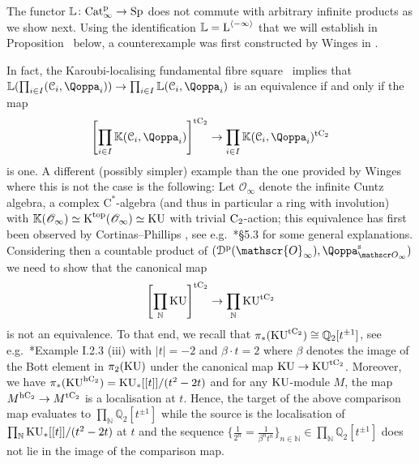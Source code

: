\begin{remark}
The functor $\mathbb{L} \colon \mathrm{Cat}^{\mathrm p}_\infty \rightarrow \mathrm{Sp}$ does not commute with arbitrary infinite products as we show next. Using the identification $\mathbb{L} = \operatorname L^{\langle -\infty \rangle}$ that we will establish in Proposition~ below, a counterexample was first constructed by Winges in \cite{winges-Ltheory}. 

In fact, the Karoubi-localising fundamental fibre square~
implies that $\KL(\prod_{i \in I} (\C_i,\QF_i)) \to \prod_{i \in I} \KL(\C_i,\QF_i)$ is an equivalence if and only if the map 
\[
\left[ \prod_{i \in I} \KK(\C_i,\QF_i)\right]^{\tC} \to \prod_{i \in I} \KK(\C_i,\QF_i)^{\tC}
\]
is one. A different (possibly simpler) example than the one provided by Winges where this is not the case is the following: Let $\mathscr{O}_\infty$ denote the infinite Cuntz algebra, a complex $\mathrm C^*$-algebra (and thus in particular a ring with involution) with $\mathbb K(\mathscr{O}_\infty) \simeq \operatorname K^\mathrm{top}(\mathscr{O}_\infty) \simeq \mathrm{KU}$ with trivial $\mathrm{C_2}$-action; this equivalence has first been observed by Cortinas--Phillips \cite{CP}, see e.g.\ \cite{BLP}*{\S 5.3} for some general explanations. Considering then a countable product of $(\Dperf(\mathscr{O}_\infty),\QF^\sym_{\mathscr O_\infty})$ we need to show that the canonical map 
\[
\left[ \prod_{\mathbb{N}} \mathrm{KU}\right]^{{\mathrm{t}\mathrm{C_2}}} \to \prod_{\mathbb{N}} \mathrm{KU}^{{\mathrm{t}\mathrm{C_2}}}
\]
is not an equivalence. To that end, we recall that $\pi_*(\mathrm{KU}^{\mathrm{t}\mathrm{C_2}}) \cong \mathbb{Q}_2[t^{\pm 1}]$, see e.g.\ \cite{NS}*{Example I.2.3 (iii)} with $|t|=-2$ and $\beta \cdot t = 2$ where $\beta$ denotes the image of the Bott element in $\pi_2(\mathrm{KU})$ under the canonical map $\mathrm{KU} \to \mathrm{KU}^{{\mathrm{t}\mathrm{C_2}}}$. Moreover, we have $\pi_*(\mathrm{KU}^{{\mathrm{h}\mathrm{C_2}}}) = \mathrm{KU}_*[[t]]/(t^2-2t)$ and for any $\mathrm{KU}$-module $M$, the map $M^{{\mathrm{h}\mathrm{C_2}}} \to M^{{\mathrm{t}\mathrm{C_2}}}$ is a localisation at $t$. 
Hence, the target of the above comparison map evaluates to $\prod_{\mathbb{N}} \mathbb{Q}_2[t^{\pm 1}]$ while the source is the localisation of $\prod_{\mathbb{N}} \mathrm{KU}_*[[t]]/(t^2-2t)$ at $t$ and the sequence $\{\frac{1}{2^n} = \frac{1}{\beta^nt^n}\}_{n \in \mathbb{N}} \in \prod_\mathbb{N} \mathbb{Q}_2[t^{\pm 1}]$ does not lie in the image of the comparison map. 
\end{remark}
